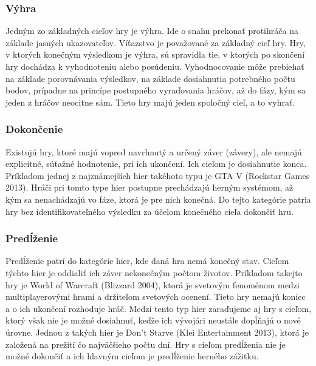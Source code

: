 \documentclass[10pt,twoside,slovak,a4paper]{article}
\begin{document}
\subsubsection{Výhra}
Jedným zo základných cieľov hry je výhra.  Ide o snahu prekonať protihráča na základe jasných ukazovateľov. Víťazstvo je považované za základný cieľ hry. Hry,  v ktorých konečným výsledkom je výhra, sú spravidla tie, v ktorých po skončení hry dochádza k vyhodnoteniu alebo posúdeniu\cite{zagal2019ultimate}. Vyhodnocovanie môže prebiehať na základe porovnávania výsledkov, na základe dosiahnutia potrebného počtu bodov,  prípadne na princípe postupného vyraďovania hráčov, až do fázy, kým sa jeden z hráčov neocitne sám. Tieto hry majú jeden spoločný cieľ, a to vyhrať.

\subsubsection{Dokončenie}
Existujú hry, ktoré majú vopred navrhnutý a určený záver (závery), ale nemajú explicitné, súťažné hodnotenie, pri ich ukončení\cite{zagal2019ultimate}. Ich cieľom je dosiahnutie konca.  Príkladom jednej z najznámejších hier takéhoto typu je GTA V (Rockstar Games 2013).  Hráči pri tomto type hier postupne prechádzajú herným systémom, až kým sa nenachádzajú vo fáze, ktorá je pre nich konečná. Do tejto kategórie patria hry bez identifikovateľného výsledku za účelom konečného cieľa dokončiť hru.

\subsubsection{Predĺženie}
Predĺženie patrí do kategórie hier, kde daná hra nemá konečný stav. Cieľom týchto hier je oddialiť ich záver nekonečným počtom životov.  Príkladom takejto hry je World of Warcraft (Blizzard 2004), ktorá je svetovým fenoménom medzi multiplayerovými hrami a držiteľom svetových ocenení.  Tieto hry nemajú koniec a o ich ukončení rozhoduje hráč. Medzi tento typ hier zaraďujeme aj hry s cieľom, ktorý však nie je možné dosiahnuť, keďže ich vývojári neustále dopĺňajú o nové úrovne. Jednou z takých hier je Don't Starve (Klei Entertainment 2013), ktorá je založená na prežití čo najväčšieho počtu dní. Hry s cieľom predĺženia nie je možné dokončiť a ich hlavným cieľom je predĺženie herného zážitku.

\end{document}
